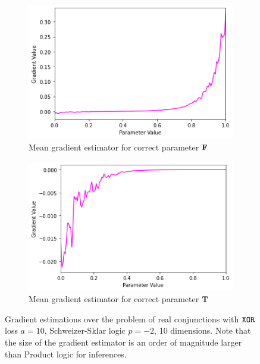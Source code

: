 \begin{figure}[h]
\begin{subfigure}[b]{0.47\textwidth}
        \includegraphics[width=\textwidth]{imgs/grad_ss_10_falseparam_avg.png}
        \caption{Mean gradient estimator for correct parameter $\textbf{F}$}
        \label{fig:conjgrad10falseavgss}
    \end{subfigure}
    \begin{subfigure}[b]{0.47\textwidth}
        \centering
        \includegraphics[width=\textwidth]{imgs/grad_ss_10_trueparam_avg.png}
        \caption{Mean gradient estimator for correct parameter $\textbf{T}$}
        \label{fig:conjgrad10trueavgss}
    \end{subfigure}
       \caption{Gradient estimations over the problem of real conjunctions with $\texttt{XOR}$ loss $a=10$, Schweizer-Sklar logic $p=-2$, 10 dimensions. Note that the size of the gradient estimator is an order of magnitude larger than Product logic for inferences.}
       \label{fig:conjgrad10ss}
\end{figure}

